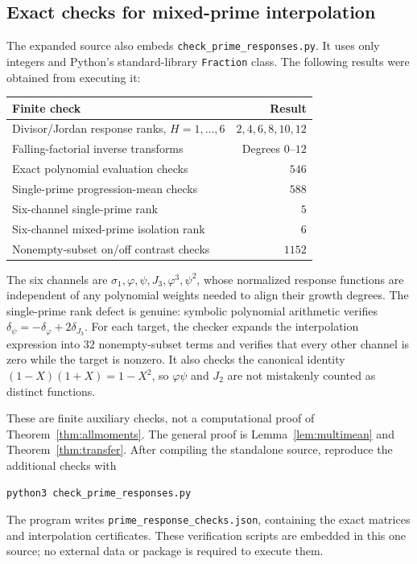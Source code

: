 \subsection{Exact checks for mixed-prime interpolation}
The expanded source also embeds \texttt{check\_prime\_responses.py}.
It uses only integers and Python's standard-library \texttt{Fraction}
class. The following results were obtained from executing it:
\begin{center}
\begin{tabular}{lr}
\toprule
Finite check & Result\\
\midrule
Divisor/Jordan response ranks, $H=1,\ldots,6$ & $2,4,6,8,10,12$\\
Falling-factorial inverse transforms & Degrees $0$--$12$\\
Exact polynomial evaluation checks & $546$\\
Single-prime progression-mean checks & $588$\\
Six-channel single-prime rank & $5$\\
Six-channel mixed-prime isolation rank & $6$\\
Nonempty-subset on/off contrast checks & $1152$\\
\bottomrule
\end{tabular}
\end{center}
The six channels are $\sigma_1,\varphi,\psi,J_3,\varphi^3,\psi^2$,
whose normalized response functions are independent of any polynomial
weights needed to align their growth degrees. The single-prime rank
defect is genuine: symbolic polynomial arithmetic verifies
$\delta_\psi=-\delta_\varphi+2\delta_{J_3}$.
For each target, the checker expands the interpolation expression
into $32$ nonempty-subset terms and verifies that every other channel
is zero while the target is nonzero. It also checks the canonical
identity $(1-X)(1+X)=1-X^2$, so $\varphi\psi$ and $J_2$ are not
mistakenly counted as distinct functions.

These are finite auxiliary checks, not a computational proof of
Theorem~\ref{thm:allmoments}. The general proof is
Lemma~\ref{lem:multimean} and Theorem~\ref{thm:transfer}.
After compiling the standalone source, reproduce the additional
checks with
\begin{lstlisting}
python3 check_prime_responses.py
\end{lstlisting}
The program writes \texttt{prime\_response\_checks.json}, containing
the exact matrices and interpolation certificates. These verification
scripts are embedded in this one source; no external data or package
is required to execute them.

